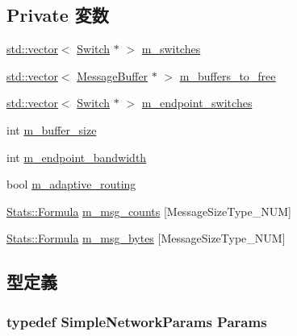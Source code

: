 \subsection*{Private 変数}
\begin{DoxyCompactItemize}
\item 
\hyperlink{classstd_1_1vector}{std::vector}$<$ \hyperlink{classSimpleNetwork_1_1Switch}{Switch} $\ast$ $>$ \hyperlink{classSimpleNetwork_a5a28d1a63e9af05191db657b73992dfb}{m\_\-switches}
\item 
\hyperlink{classstd_1_1vector}{std::vector}$<$ \hyperlink{classMessageBuffer}{MessageBuffer} $\ast$ $>$ \hyperlink{classSimpleNetwork_aeb4204d50ceb840342cc89cd607e8fa9}{m\_\-buffers\_\-to\_\-free}
\item 
\hyperlink{classstd_1_1vector}{std::vector}$<$ \hyperlink{classSimpleNetwork_1_1Switch}{Switch} $\ast$ $>$ \hyperlink{classSimpleNetwork_a4f9f7f675317c0d0aec2f9272b1f4cba}{m\_\-endpoint\_\-switches}
\item 
int \hyperlink{classSimpleNetwork_ad58a86eb05a281840a92bb3d04adb9b1}{m\_\-buffer\_\-size}
\item 
int \hyperlink{classSimpleNetwork_a87d1115e90c126f4a0727873d2e9d72d}{m\_\-endpoint\_\-bandwidth}
\item 
bool \hyperlink{classSimpleNetwork_aa52418a2407639815b836666cca8f570}{m\_\-adaptive\_\-routing}
\item 
\hyperlink{classStats_1_1Formula}{Stats::Formula} \hyperlink{classSimpleNetwork_aab66b83ab5d0c228e10abb19ddbc78f2}{m\_\-msg\_\-counts} \mbox{[}MessageSizeType\_\-NUM\mbox{]}
\item 
\hyperlink{classStats_1_1Formula}{Stats::Formula} \hyperlink{classSimpleNetwork_a88ad01e3ba9f7c20e95be6554a9badd6}{m\_\-msg\_\-bytes} \mbox{[}MessageSizeType\_\-NUM\mbox{]}
\end{DoxyCompactItemize}


\subsection{型定義}
\hypertarget{classSimpleNetwork_acfd32ca05df7999ec705e4800d022dbf}{
\subsubsection[{Params}]{\setlength{\rightskip}{0pt plus 5cm}typedef SimpleNetworkParams {\bf Params}}}
\label{classSimpleNetwork_acfd32ca05df7999ec705e4800d022dbf}


